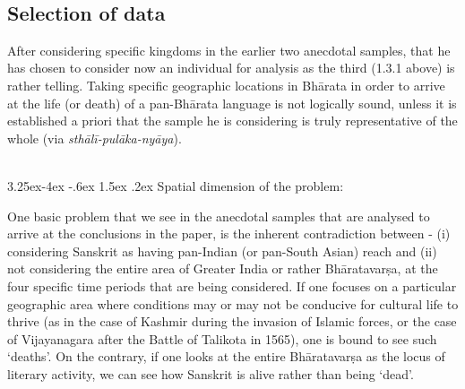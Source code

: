 \makeatletter
\renewcommand\subsubsection{\@startsection{subsubsection}{3}{\z@}%
                                     {3.25ex\@plus -4ex \@minus -.6ex}%
                                     {1.5ex \@plus .2ex}%
                                     {\normalfont\normalsize\bfseries}}
\makeatother

~\\[-20pt]

\subsection{Selection of data}

After considering specific kingdoms in the earlier two anecdotal samples, that he has chosen to consider now an individual for analysis as the third (1.3.1 above) is rather telling. Taking specific geographic locations in Bhārata in order to arrive at the life (or death) of a pan-Bhārata language is not logically sound, unless it is established a priori that the sample he is considering is truly representative of the whole (via {\sl sthālī-pulāka-nyāya}). 

~\\[-40pt]

\subsubsection{Spatial dimension of the problem:}
\vskip -5pt

One basic problem that we see in the anecdotal samples that are analysed to arrive at the conclusions in the paper, is the inherent contradiction between - (i) considering Sanskrit as having pan-Indian (or pan-South Asian) reach and (ii) not considering the entire area of Greater India or rather Bhāratavarṣa, at the four specific time periods that are being considered. If one focuses on a particular geographic area where conditions may or may not be conducive for cultural life to thrive (as in the case of Kashmir during the invasion of Islamic forces, or the case of Vijayanagara after the Battle of Talikota in 1565), one is bound to see such ‘deaths’. On the contrary, if one looks at the entire Bhāratavarṣa as the locus of literary activity, we can see how Sanskrit is alive rather than being ‘dead’. 

